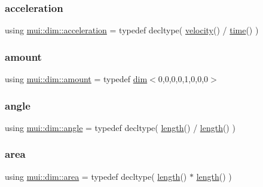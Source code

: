\subsubsection{\texorpdfstring{acceleration}{acceleration}}
{\footnotesize\ttfamily using \hyperlink{namespacemui_1_1dim_aec150f5d30ea4484d99cbfaf1d6f80c9}{mui\+::dim\+::acceleration} = typedef decltype( \hyperlink{namespacemui_1_1dim_a2ed9711eaaf9db79861b69ffa35d277d}{velocity}() / \hyperlink{namespacemui_1_1dim_a3d3a0014025f1c2c0dd7418791928500}{time}() )}

\mbox{\label{namespacemui_1_1dim_a00ff3f13d3bd0f4564227904373dc3eb}} 
\subsubsection{\texorpdfstring{amount}{amount}}
{\footnotesize\ttfamily using \hyperlink{namespacemui_1_1dim_a00ff3f13d3bd0f4564227904373dc3eb}{mui\+::dim\+::amount} = typedef \hyperlink{structmui_1_1dim_1_1dim}{dim}$<$0,0,0,0,1,0,0,0$>$}

\mbox{\label{namespacemui_1_1dim_a967db7ab1d1127cdb94fe084e592d1e0}} 
\subsubsection{\texorpdfstring{angle}{angle}}
{\footnotesize\ttfamily using \hyperlink{namespacemui_1_1dim_a967db7ab1d1127cdb94fe084e592d1e0}{mui\+::dim\+::angle} = typedef decltype( \hyperlink{namespacemui_1_1dim_ade9a9679bc46e16322ef419974faebe6}{length}() / \hyperlink{namespacemui_1_1dim_ade9a9679bc46e16322ef419974faebe6}{length}() )}

\mbox{\label{namespacemui_1_1dim_aedf0a30e04c732a032fe7e04d3260ee3}} 
\subsubsection{\texorpdfstring{area}{area}}
{\footnotesize\ttfamily using \hyperlink{namespacemui_1_1dim_aedf0a30e04c732a032fe7e04d3260ee3}{mui\+::dim\+::area} = typedef decltype( \hyperlink{namespacemui_1_1dim_ade9a9679bc46e16322ef419974faebe6}{length}() $\ast$ \hyperlink{namespacemui_1_1dim_ade9a9679bc46e16322ef419974faebe6}{length}() )}

